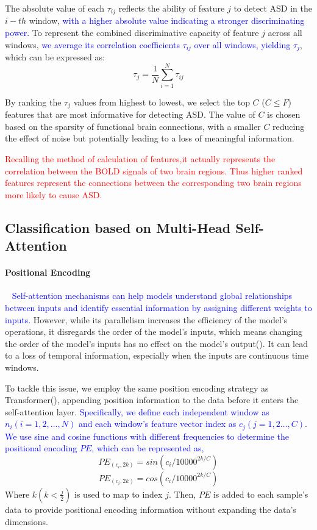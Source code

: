 \documentclass[a4paper]{cas-dc}
\begin{document}
The absolute value of each $\tau_{ij}$ reflects the ability of feature $j$ to detect ASD in the $i-th$ window,\textcolor{blue}{ with a higher absolute value indicating a stronger discriminating power.} To represent the combined discriminative capacity of feature $j$ across all windows, \textcolor{blue}{we average its correlation coefficients $\tau_{ij}$ over all windows, yielding $\tau_{j}$}, which can be expressed as:
\begin{equation}
	\tau_{j} =  \frac{1}{N}\sum_{i=1}^{N}\tau_{ij}
\end{equation}

By ranking the $\tau_{j}$ values from highest to lowest, we select the top $C$ ($C\leq F$) features that are most informative for detecting ASD. The value of $C$ is chosen based on the sparsity of functional brain connections, with a smaller $C$ reducing the effect of noise but potentially leading to a loss of meaningful information. 

\textcolor{red}{Recalling the method of calculation of features,it actually represents the correlation between the BOLD signals of two brain regions. Thus higher ranked features represent the connections between the corresponding two brain regions more likely to cause ASD.}
\subsection{Classification based on Multi-Head Self-Attention}
\paragraph{Positional Encoding}~{}
\newline
\indent \textcolor{blue}{Self-attention mechanisms can help models understand global relationships between inputs and identify essential information by assigning different weights to inputs.} However, while its parallelism increases the efficiency of the model's operations, it disregards the order of the model's inputs, which means changing the order of the model's inputs has no effect on the model's output(\cite{litjens2017survey}). It can lead to a loss of temporal information, especially when the inputs are continuous time windows.

To tackle this issue, we employ the same position encoding strategy as Transformer(\cite{vaswani2017attention}), appending position information to the data before it enters the self-attention layer. \textcolor{blue}{Specifically, we define each independent window as $n_i(i=1,2,..., N)$ and each window's feature vector index as $c_j(j=1,2..., C)$. We use sine and cosine functions with different frequencies to determine the positional encoding $PE$, which can be represented as,}
\begin{equation}
	PE_{(c_i,2k)}=sin(c_i/10000^{2k/C})
\end{equation}
\begin{equation}
	PE_{(c_i,2k)}=cos(c_i/10000^{2k/C})
\end{equation}
Where $k(k<\frac{j}{2})$ is used to map to index $j$. Then, $PE$ is added to each sample's data to provide positional encoding information without expanding the data's dimensions.
\end{document}
